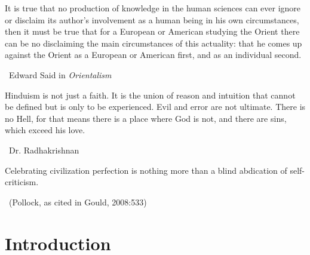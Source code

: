 \begin{myquote}
It is true that no production of knowledge in the human sciences can ever ignore or disclaim its author’s involvement as a human being in his own circumstances, then it must be true that for a European or American studying the Orient there can be no disclaiming the main circumstances of this actuality: that he comes up against the Orient as a European or American first, and as an individual second. 

\vskip -2pt

~\hfill Edward Said in \textit{Orientalism}
\end{myquote}

\begin{myquote}
Hinduism is not just a faith. It is the union of reason and intuition that cannot be defined but is only to be experienced. Evil and error are not ultimate. There is no Hell, for that means there is a place where God is not, and there are sins, which exceed his love. 

\vskip -5pt

~\hfill Dr. Radhakrishnan
\end{myquote}

\begin{myquote}
Celebrating civilization perfection is nothing more than a blind abdication of self-criticism. 

\vskip -5pt

~\hfill (Pollock, as cited in Gould, 2008:533)
\end{myquote}


\section*{Introduction}

